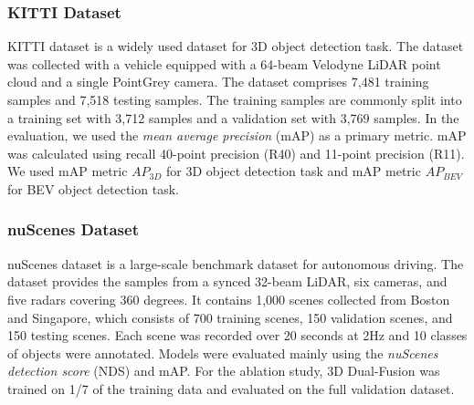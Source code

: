 \documentclass[lettersize,journal]{IEEEtran}
\begin{document}
\subsubsection{KITTI Dataset}
KITTI dataset is a widely used dataset for 3D object detection task. The dataset was collected with a vehicle equipped with a 64-beam Velodyne LiDAR point cloud and a single PointGrey camera. The dataset comprises 7,481 training samples and 7,518 testing samples. The training samples are commonly split into a training set with 3,712 samples and a validation set with 3,769 samples. In the evaluation, we used the {\it mean average precision} (mAP) as a primary metric. mAP was calculated using recall 40-point precision (R40) and 11-point precision (R11).   We used mAP metric $AP_{3D}$ for 3D object detection task and mAP metric $AP_{BEV}$ for BEV object detection task. 

\subsubsection{nuScenes Dataset}
nuScenes dataset is a large-scale benchmark dataset for autonomous driving. The dataset provides the samples from a synced 32-beam LiDAR, six cameras, and five radars covering 360 degrees. It contains 1,000 scenes collected from Boston and Singapore, which consists of 700 training scenes, 150 validation scenes, and 150 testing scenes.  Each scene was recorded over 20 seconds at 2Hz and  10 classes of objects were annotated.  Models were evaluated mainly using the {\it nuScenes detection score} (NDS) \cite{nuscenes} and mAP. For the ablation study, 3D Dual-Fusion was trained on  1/7 of the training data and evaluated on the full validation dataset.
\end{document}
